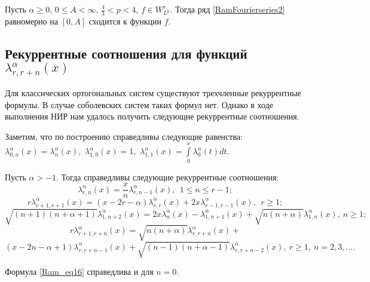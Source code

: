 \begin{theorem}\label{Ram_thm1}
	Пусть $\alpha\geq0$, $0\leq A<\infty$, $\frac{4}{3}<p<4$, $f\in W^r_{L^p}$. Тогда ряд \eqref{RamFourierseries2} равномерно на $[0, A]$ сходится к функции $f$.
\end{theorem}

\subsection{Рекуррентные соотношения для функций $\lambda_{r,r+n}^{\alpha}(x)$}\label{Ram_sec4}
Для классических ортогональных систем существуют трехчленные рекуррентные формулы. В случае соболевских систем таких формул нет. Однако в ходе выполнения НИР нам удалось получить следующие рекуррентные соотношения. 

Заметим, что по построению справедливы следующие равенства: $\lambda_{0,n}^\alpha(x)=\lambda_{n}^\alpha(x),$ $\lambda_{1,0}^\alpha(x)=1,$ $\lambda_{1,1}^\alpha(x)=\int\limits_0^x\lambda^\alpha_0(t)dt$.

\begin{theorem}\label{Ram_thm2}
	Пусть $\alpha>-1$. Тогда справедливы следующие рекуррентные соотношения:
	\begin{equation*}
	\lambda_{r,n}^\alpha(x)=\frac{x}{n}\lambda_{r,n-1}^\alpha(x), \ \ 1\leq n\leq r-1;
	\end{equation*}
	\begin{equation*}
	r\lambda_{r+1,r+1}^\alpha(x)=(x-2r-\alpha)\lambda_{r,r}^\alpha(x)+2x\lambda_{r-1,r-1}^\alpha(x), \ \ r\geq 1;
	\end{equation*}
	\begin{equation}\label{Ram_eq16}
	\sqrt{(n+1)(n+\alpha+1)}\lambda_{1,n+2}^\alpha(x)= 2x\lambda_{n}^{\alpha}(x)-\lambda_{1,n+1}^{\alpha}(x)+
	\sqrt{n(n+\alpha)} \lambda_{1,n}^{\alpha}(x), \ n\geq 1;
	\end{equation}
	$$
	r\lambda_{r+1,r+n}^\alpha(x)=\sqrt{n(n+\alpha)}\lambda_{r,r+n}^{\alpha}(x)+
	$$
	\begin{equation*}
	\left(x - 2n-\alpha+1\right)\lambda_{r,r+n-1}^{\alpha}(x)
	+\sqrt{(n-1)(n+\alpha-1)}\lambda_{r,r+n-2}^{\alpha}(x), \ r\geq 1, \ n=2, 3, \ldots.
	\end{equation*}
\end{theorem}

\begin{remark}
	Формула \eqref{Ram_eq16} справедлива и для $n=0$.
\end{remark}

